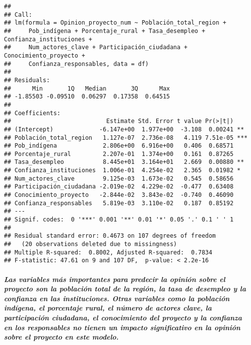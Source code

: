 \documentclass[
]{article}
\begin{document}
\begin{verbatim}
## 
## Call:
## lm(formula = Opinion_proyecto_num ~ Población_total_region + 
##     Pob_indígena + Porcentaje_rural + Tasa_desempleo + Confianza_instituciones + 
##     Num_actores_clave + Participación_ciudadana + Conocimiento_proyecto + 
##     Confianza_responsables, data = df)
## 
## Residuals:
##      Min       1Q   Median       3Q      Max 
## -1.85503 -0.09510  0.06297  0.17358  0.64515 
## 
## Coefficients:
##                           Estimate Std. Error t value Pr(>|t|)    
## (Intercept)             -6.147e+00  1.977e+00  -3.108  0.00241 ** 
## Población_total_region   1.127e-07  2.736e-08   4.119 7.51e-05 ***
## Pob_indígena             2.806e+00  6.916e+00   0.406  0.68571    
## Porcentaje_rural         2.207e-01  1.374e+00   0.161  0.87265    
## Tasa_desempleo           8.445e+01  3.164e+01   2.669  0.00880 ** 
## Confianza_instituciones  1.006e-01  4.254e-02   2.365  0.01982 *  
## Num_actores_clave        9.125e-03  1.673e-02   0.545  0.58656    
## Participación_ciudadana -2.019e-02  4.229e-02  -0.477  0.63408    
## Conocimiento_proyecto   -2.844e-02  3.843e-02  -0.740  0.46090    
## Confianza_responsables   5.819e-03  3.110e-02   0.187  0.85192    
## ---
## Signif. codes:  0 '***' 0.001 '**' 0.01 '*' 0.05 '.' 0.1 ' ' 1
## 
## Residual standard error: 0.4673 on 107 degrees of freedom
##   (20 observations deleted due to missingness)
## Multiple R-squared:  0.8002, Adjusted R-squared:  0.7834 
## F-statistic: 47.61 on 9 and 107 DF,  p-value: < 2.2e-16
\end{verbatim}

\subparagraph{\texorpdfstring{\emph{Las variables más importantes para
predecir la opinión sobre el proyecto son la población total de la
región, la tasa de desempleo y la confianza en las instituciones. Otras
variables como la población indígena, el porcentaje rural, el número de
actores clave, la participación ciudadana, el conocimiento del proyecto
y la confianza en los responsables no tienen un impacto significativo en
la opinión sobre el proyecto en este
modelo.}}{Las variables más importantes para predecir la opinión sobre el proyecto son la población total de la región, la tasa de desempleo y la confianza en las instituciones. Otras variables como la población indígena, el porcentaje rural, el número de actores clave, la participación ciudadana, el conocimiento del proyecto y la confianza en los responsables no tienen un impacto significativo en la opinión sobre el proyecto en este modelo.}}\label{las-variables-muxe1s-importantes-para-predecir-la-opiniuxf3n-sobre-el-proyecto-son-la-poblaciuxf3n-total-de-la-regiuxf3n-la-tasa-de-desempleo-y-la-confianza-en-las-instituciones.-otras-variables-como-la-poblaciuxf3n-induxedgena-el-porcentaje-rural-el-nuxfamero-de-actores-clave-la-participaciuxf3n-ciudadana-el-conocimiento-del-proyecto-y-la-confianza-en-los-responsables-no-tienen-un-impacto-significativo-en-la-opiniuxf3n-sobre-el-proyecto-en-este-modelo.}
\end{document}
